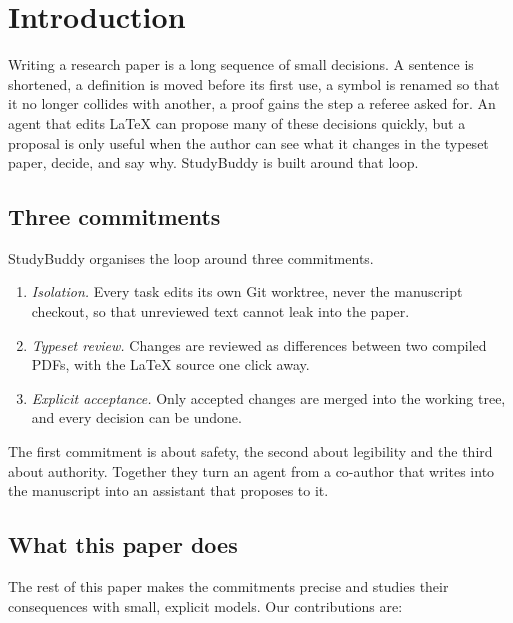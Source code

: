 \section{Introduction}
\label{sec:introduction}

Writing a research paper is a long sequence of small decisions. A sentence is
shortened, a definition is moved before its first use, a symbol is renamed so
that it no longer collides with another, a proof gains the step a referee
asked for. An agent that edits \LaTeX{} can propose many of these decisions
quickly, but a proposal is only useful when the author can see what it changes
in the typeset paper, decide, and say why. StudyBuddy is built around that loop.

\subsection{Three commitments}

StudyBuddy organises the loop around three commitments.

\begin{enumerate}[label=(C\arabic*)]
  \item \emph{Isolation.} Every task edits its own Git worktree, never the
    manuscript checkout, so that unreviewed text cannot leak into the paper.
  \item \emph{Typeset review.} Changes are reviewed as differences between two
    compiled PDFs, with the \LaTeX{} source one click away.
  \item \emph{Explicit acceptance.} Only accepted changes are merged into the
    working tree, and every decision can be undone.
\end{enumerate}

The first commitment is about safety, the second about legibility and the
third about authority. Together they turn an agent from a co-author that writes
into the manuscript into an assistant that proposes to it.

\subsection{What this paper does}

The rest of this paper makes the commitments precise and studies their
consequences with small, explicit models. Our contributions are:

